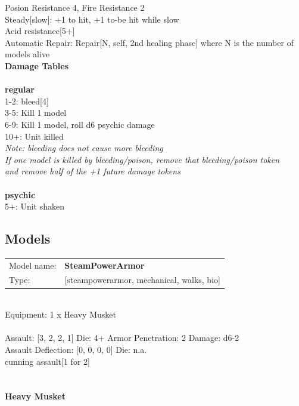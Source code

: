 Posion Resistance 4, Fire Resistance 2\\ 
Steady[slow]: +1 to hit, +1 to-be hit while slow\\ 
Acid resistance[5+]\\ 
Automatic Repair: Repair[N, self, 2nd healing phase] where N is the number of models alive\\ 



{\bf Damage Tables} \\
\ \\ {\bf regular } \\
1-2: bleed[4] \\
3-5: Kill 1 model \\
6-9: Kill 1 model, roll d6 psychic damage \\
10+: Unit killed \\
{{\it Note: bleeding does not cause more bleeding}} \\
{{\it If one model is killed by bleeding/poison, remove that bleeding/poison token}} \\
{{\it and remove half of the +1 future damage tokens}} \\
\ \\ {\bf psychic } \\
5+: Unit shaken \\


\clearpage

\subsection{ Models }

\begin{tabular}{ll}
Model name: & {\bf SteamPowerArmor } \\
Type: & [steampowerarmor, mechanical, walks, bio] \\
\end{tabular}
\ \\
Equipment: 1 x Heavy Musket \\
\ \\
Assault: [3, 2, 2, 1] Die: 4+ Armor Penetration: 2 Damage: d6-2 \\
Assault Deflection: [0, 0, 0, 0] Die: n.a.\\
\indent cunning assault[1 for 2]\\ 
 
\ \\

\ \\
{\bf Heavy Musket } \\



